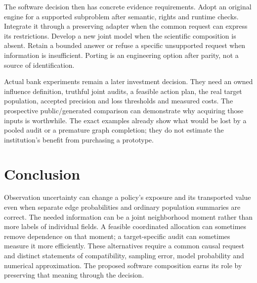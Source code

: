 The software decision then has concrete evidence requirements. Adopt an
original engine for a supported subproblem after semantic, rights and
runtime checks. Integrate it through a preserving adapter when the common
request can express its restrictions. Develop a new joint model when the
scientific composition is absent. Retain a bounded answer or refuse a
specific unsupported request when information is insufficient. Porting is
an engineering option after parity, not a source of identification.

Actual bank experiments remain a later investment decision. They need an
owned influence definition, truthful joint audits, a feasible action plan,
the real target population, accepted precision and loss thresholds and
measured costs. The prospective public/generated comparison can demonstrate
why acquiring those inputs is worthwhile. The exact examples already show
what would be lost by a pooled audit or a premature graph completion; they
do not estimate the institution's benefit from purchasing a prototype.



\section{Conclusion}
\label{exec17:s7-end}

Observation uncertainty can change a policy's exposure and its transported
value even when separate edge probabilities and ordinary population summaries
are correct. The needed information can be a joint neighborhood moment rather
than more labels of individual fields. A feasible coordinated allocation can
sometimes remove dependence on that moment; a target-specific audit can
sometimes measure it more efficiently. These alternatives require a common
causal request and distinct statements of compatibility, sampling error,
model probability and numerical approximation. The proposed software
composition earns its role by preserving that meaning through the decision.
